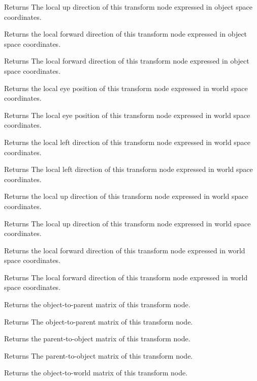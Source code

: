 \begin{DoxyReturn}{Returns}
The local up direction of this transform node expressed in object space coordinates.
\end{DoxyReturn}
Returns the local forward direction of this transform node expressed in object space coordinates.

\begin{DoxyReturn}{Returns}
The local forward direction of this transform node expressed in object space coordinates.
\end{DoxyReturn}
Returns the local eye position of this transform node expressed in world space coordinates.

\begin{DoxyReturn}{Returns}
The local eye position of this transform node expressed in world space coordinates.
\end{DoxyReturn}
Returns the local left direction of this transform node expressed in world space coordinates.

\begin{DoxyReturn}{Returns}
The local left direction of this transform node expressed in world space coordinates.
\end{DoxyReturn}
Returns the local up direction of this transform node expressed in world space coordinates.

\begin{DoxyReturn}{Returns}
The local up direction of this transform node expressed in world space coordinates.
\end{DoxyReturn}
Returns the local forward direction of this transform node expressed in world space coordinates.

\begin{DoxyReturn}{Returns}
The local forward direction of this transform node expressed in world space coordinates.
\end{DoxyReturn}
Returns the object-\/to-\/parent matrix of this transform node.

\begin{DoxyReturn}{Returns}
The object-\/to-\/parent matrix of this transform node.
\end{DoxyReturn}
Returns the parent-\/to-\/object matrix of this transform node.

\begin{DoxyReturn}{Returns}
The parent-\/to-\/object matrix of this transform node.
\end{DoxyReturn}
Returns the object-\/to-\/world matrix of this transform node.

